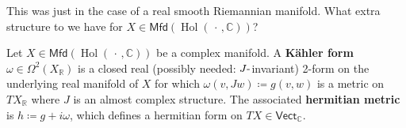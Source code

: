 \begin{remark}

This was just in the case of a real smooth Riemannian manifold. What
extra structure to we have for
\(X \in {\mathsf{Mfd}}(\mathop{\mathrm{Hol}}({\,\cdot\,}, {\mathbb{C}}) )\)?

\end{remark}

\begin{definition}

Let
\(X\in {\mathsf{Mfd}}( \mathop{\mathrm{Hol}}({\,\cdot\,}, {\mathbb{C}}) )\)
be a complex manifold. A \textbf{Kähler form}
\(\omega\in \Omega^2(X_{\mathbb{R}})\) is a closed real (possibly
needed: \(J{\hbox{-}}\)invariant) 2-form on the underlying real manifold
of \(X\) for which \(\omega(v, Jw) \coloneqq g(v, w)\) is a metric on
\(TX_{\mathbb{R}}\) where \(J\) is an almost complex structure. The
associated \textbf{hermitian metric} is \(h\coloneqq g + i \omega\),
which defines a hermitian form on
\(TX \in {\mathsf{Vect}}_{\mathbb{C}}\).

\end{definition}

